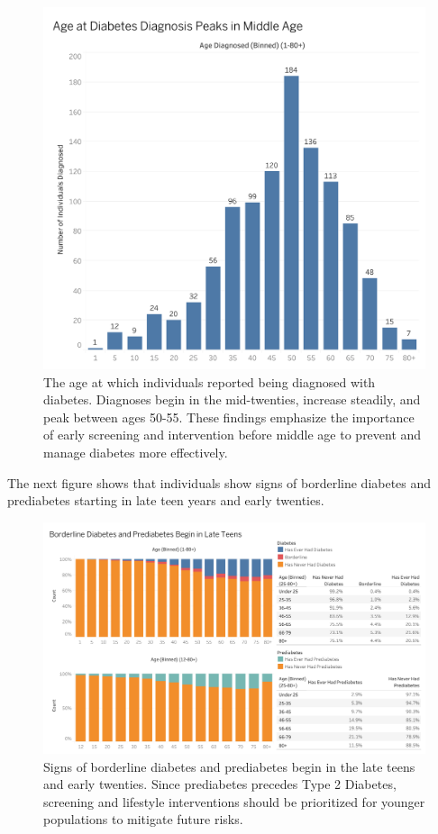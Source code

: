 \documentclass[
]{article}
\begin{document}
\begin{figure}[H]

{\centering \includegraphics[width=0.8\linewidth]{../figures/Age Distribution of Diabetes Diagnoses} 

}

\caption{The age at which individuals reported being diagnosed with diabetes. Diagnoses begin in the mid-twenties, increase steadily, and peak between ages 50-55. These findings emphasize the importance of early screening and intervention before middle age to prevent and manage diabetes more effectively.}\label{fig:fig_age_diagnosis_distribution}
\end{figure}

The next figure shows that individuals show signs of borderline diabetes
and prediabetes starting in late teen years and early twenties.

\begin{figure}[H]

{\centering \includegraphics[width=0.9\linewidth]{../figures/Early Indicators of Diabetes Risk in Adolescents And Young Adults} 

}

\caption{Signs of borderline diabetes and prediabetes begin in the late teens and early twenties. Since prediabetes precedes Type 2 Diabetes, screening and lifestyle interventions should be prioritized for younger populations to mitigate future risks.}\label{fig:fig_prediabetes_indicators}
\end{figure}
\end{document}
